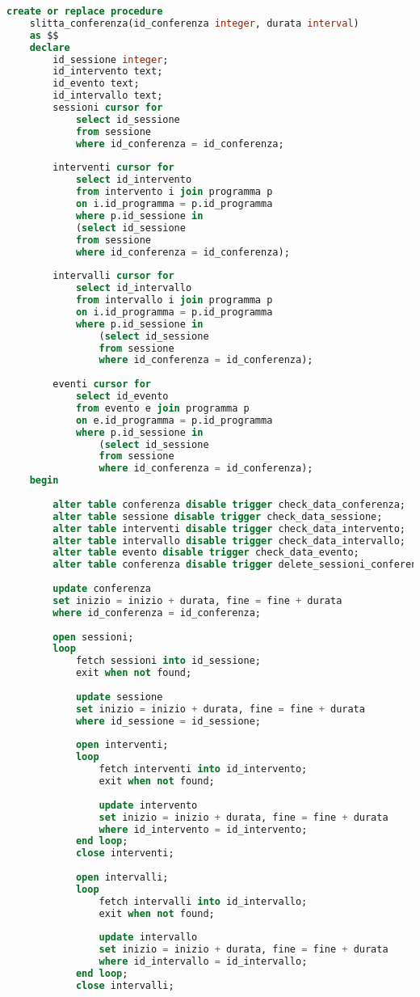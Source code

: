 \begin{lstlisting}[language=SQL, style=mystyle]
	create or replace procedure 
	slitta_conferenza(id_conferenza integer, durata interval)
	as $$
	declare
		id_sessione integer;
		id_intervento text;
		id_evento text;
		id_intervallo text;
		sessioni cursor for 
			select id_sessione 
			from sessione 
			where id_conferenza = id_conferenza;
			
		interventi cursor for
			select id_intervento 
			from intervento i join programma p 
			on i.id_programma = p.id_programma 
			where p.id_sessione in 
			(select id_sessione 
			from sessione 
			where id_conferenza = id_conferenza);
			
		intervalli cursor for
			select id_intervallo 
			from intervallo i join programma p 
			on i.id_programma = p.id_programma 
			where p.id_sessione in 
				(select id_sessione 
				from sessione 
				where id_conferenza = id_conferenza);
				
		eventi cursor for
			select id_evento 
			from evento e join programma p 
			on e.id_programma = p.id_programma 
			where p.id_sessione in 
				(select id_sessione 
				from sessione 
				where id_conferenza = id_conferenza);
	begin
	
		alter table conferenza disable trigger check_data_conferenza;
		alter table sessione disable trigger check_data_sessione;
		alter table interventi disable trigger check_data_intervento;
		alter table intervallo disable trigger check_data_intervallo;
		alter table evento disable trigger check_data_evento;
		alter table conferenza disable trigger delete_sessioni_conferenza;
		
		update conferenza
		set inizio = inizio + durata, fine = fine + durata
		where id_conferenza = id_conferenza;
	
		open sessioni;
		loop
			fetch sessioni into id_sessione;
			exit when not found;
			
			update sessione
			set inizio = inizio + durata, fine = fine + durata
			where id_sessione = id_sessione;
		
			open interventi;
			loop
				fetch interventi into id_intervento;
				exit when not found;
	
				update intervento
				set inizio = inizio + durata, fine = fine + durata
				where id_intervento = id_intervento;
			end loop;
			close interventi;
			
			open intervalli;
			loop
				fetch intervalli into id_intervallo;
				exit when not found;
	
				update intervallo
				set inizio = inizio + durata, fine = fine + durata
				where id_intervallo = id_intervallo;
			end loop;
			close intervalli;
			

\end{lstlisting}
